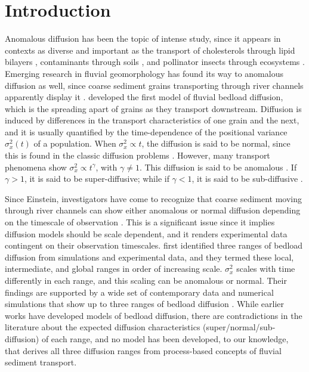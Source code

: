 \documentclass[]{agujournal2018}
\begin{document}
\section{Introduction}
Anomalous diffusion has been the topic of intense study, since it appears in contexts as diverse and important as the transport of cholesterols through lipid bilayers \citep{Jeon2012,Molina-Garcia2018}, contaminants through soils \citep{Berkowitz2006,Yang2019}, and pollinator insects through ecosystems \citep{Reynolds2009,Vallaeys2017}.
Emerging research in fluvial geomorphology has found its way to anomalous diffusion as well, since coarse sediment grains transporting through river channels apparently display it \citep{Martin2012,Bradley2017}.
\citet{Einstein1937} developed the first model of fluvial bedload diffusion, which is the spreading apart of grains as they transport downstream.
Diffusion is induced by differences in the transport characteristics of one grain and the next, and it is usually quantified by the time-dependence of the positional variance $\sigma_x^2(t)$ of a population.
When $\sigma_x^2 \propto t$, the diffusion is said to be normal, since this is found in the classic diffusion problems \citep[e.g.][]{Einstein1905,Taylor1920}.
However, many transport phenomena show $\sigma_x^2 \propto t^\gamma$, with $\gamma \neq 1$. This diffusion is said to be anomalous \citep{Sokolov2012}.
If $\gamma>1$, it is said to be super-diffusive; while if $\gamma <1$, it is said to be sub-diffusive \citep{Metzler2000}.

Since Einstein, investigators have come to recognize that coarse sediment moving through river channels can show either anomalous or normal diffusion depending on the timescale of observation \citep{Nikora2002}.
This is a significant issue since it implies diffusion models should be scale dependent, and it renders experimental data contingent on their observation timescales.
\citet{Nikora2001a,Nikora2002} first identified three ranges of bedload diffusion from simulations and experimental data, and they termed these local, intermediate, and global ranges in order of increasing scale.
$\sigma_x^2$ scales with time differently in each range, and this scaling can be anomalous or normal.
Their findings are supported by a wide set of contemporary data and numerical simulations that show up to three ranges of bedload diffusion \citep{Martin2012, Bialik2012, Zhang2012, Fan2016, Bradley2017,Wu2019}.
While earlier works have developed models of bedload diffusion, there are contradictions in the literature about the expected diffusion characteristics (super/normal/sub-diffusion) of each range, and no model has been developed, to our knowledge, that derives all three diffusion ranges from process-based concepts of fluvial sediment transport.
\end{document}

